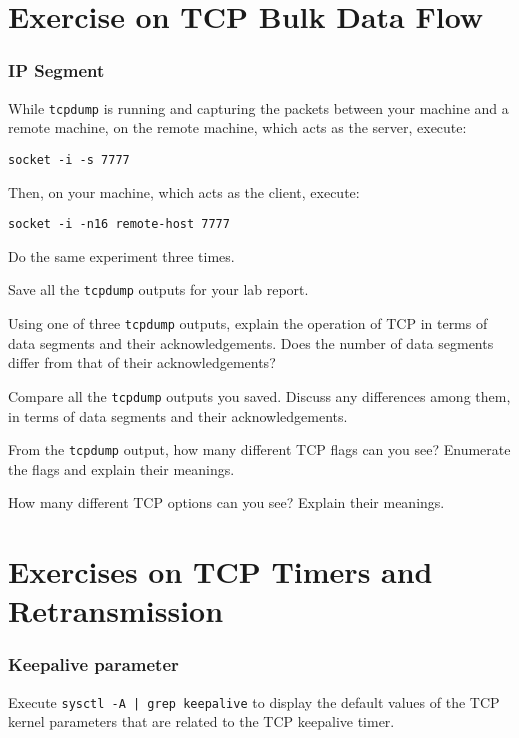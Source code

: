 \documentclass{../UTNetLab}
\begin{document}
\part{Exercise on TCP Bulk Data Flow}
\section{IP Segment}
    While \lstinline{tcpdump} is running and capturing the packets between your machine and a remote machine, on the remote machine, which acts as the server, execute:
    \begin{lstlisting}
socket -i -s 7777
    \end{lstlisting}
    Then, on your machine, which acts as the client, execute:
    \begin{lstlisting}[emph={your-host, remote-host}]
socket -i -n16 remote-host 7777
    \end{lstlisting}
    Do the same experiment three times.

    Save all the \lstinline{tcpdump} outputs for your lab report.
    
    \begin{report}
    \item Using one of three \lstinline{tcpdump} outputs, explain the operation of TCP in terms of data segments and their acknowledgements.
            Does the number of data segments differ from that of their acknowledgements?

    Compare all the \lstinline{tcpdump} outputs you saved.
    Discuss any differences among them, in terms of data segments and their acknowledgements.
    
    \item From the \lstinline{tcpdump} output, how many different TCP flags can you see? Enumerate the flags and explain their meanings.

    How many different TCP options can you see?
    Explain their meanings.
    \end{report}

\part{Exercises on TCP Timers and Retransmission}
\section{Keepalive parameter}
    Execute \lstinline{sysctl -A | grep keepalive} to display the default values of the TCP kernel parameters that are related to the TCP keepalive timer.
\end{document}
